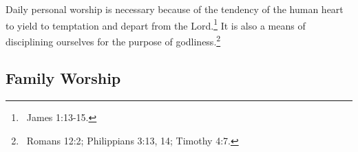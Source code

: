 \begin{outerlst}[left=0pt,labelsep=0pt]
\begin{innerlst}[resume*]
      \item Daily personal worship is necessary because of the tendency of the human heart to yield to temptation and depart from the Lord.\footnote{\ James 1:13-15.} It is also a means of disciplining ourselves for the purpose of godliness.\footnote{\ Romans 12:2; Philippians 3:13, 14; Timothy 4:7.} 
\end{innerlst} 

\subsection{Family Worship}  


\end{outerlst}
